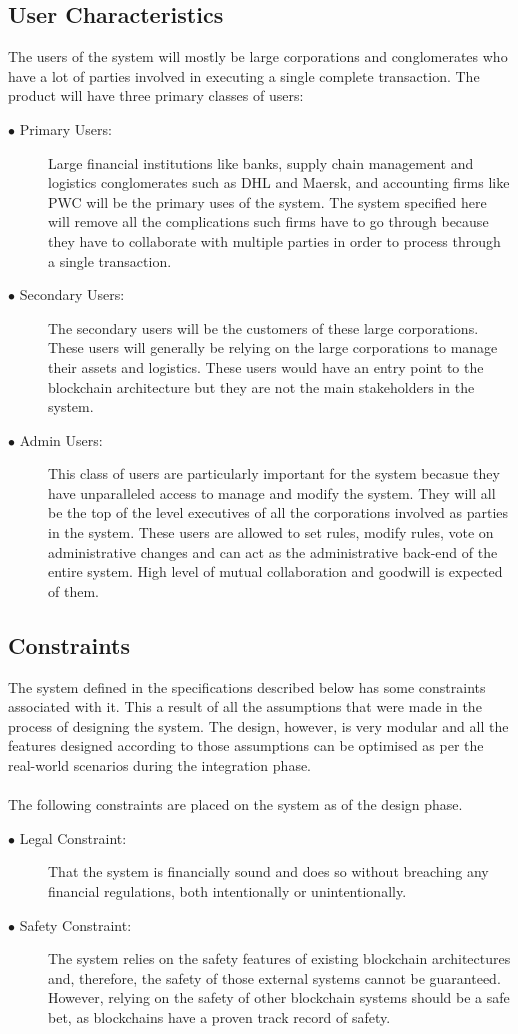 \documentclass[a4paper,twoside,phd]{BYUPhys}
\begin{document}
\subsection{User Characteristics}
The users of the system will mostly be large corporations and conglomerates who have a lot of parties involved in executing a single complete transaction. The product will have three primary classes of users:
\begin{description}
\item[$\bullet$ Primary Users:] Large financial institutions like banks, supply chain management and logistics conglomerates such as DHL and Maersk, and accounting firms like PWC will be the primary uses of the system. The system specified here will remove all the complications such firms have to go through because they have to collaborate with multiple parties in order to process through a single transaction.
\item[$\bullet$ Secondary Users:] The secondary users will be the customers of these large corporations. These users will generally be relying on the large corporations to manage their assets and logistics. These users would have an entry point to the blockchain architecture but they are not the main stakeholders in the system.
\item[$\bullet$ Admin Users:] This class of users are particularly important for the system becasue they have unparalleled access to manage and modify the system. They will all be the top of the level executives of all the corporations involved as parties in the system. These users are allowed to set rules, modify rules, vote on administrative changes and can act as the administrative back-end of the entire system. High level of mutual collaboration and goodwill is expected of them. 
\end{description} 
\subsection{Constraints}
The system defined in the specifications described below has some constraints associated with it. This a result of all the assumptions that were made in the process of designing the system. The design, however, is very modular and all the features designed according to those assumptions can be optimised as per the real-world scenarios during the integration phase.
\\
\\
The following constraints are placed on the system as of the design phase.
\begin{description}
\item[$\bullet$ Legal Constraint:] That the system is financially sound and does so without breaching any financial regulations, both intentionally or unintentionally.
\item[$\bullet$ Safety Constraint:] The system relies on the safety features of existing blockchain architectures and, therefore, the safety of those external systems cannot be guaranteed. However, relying on the safety of other blockchain systems should be a safe bet, as blockchains have a proven track record of safety.
\end{description}
\end{document}
